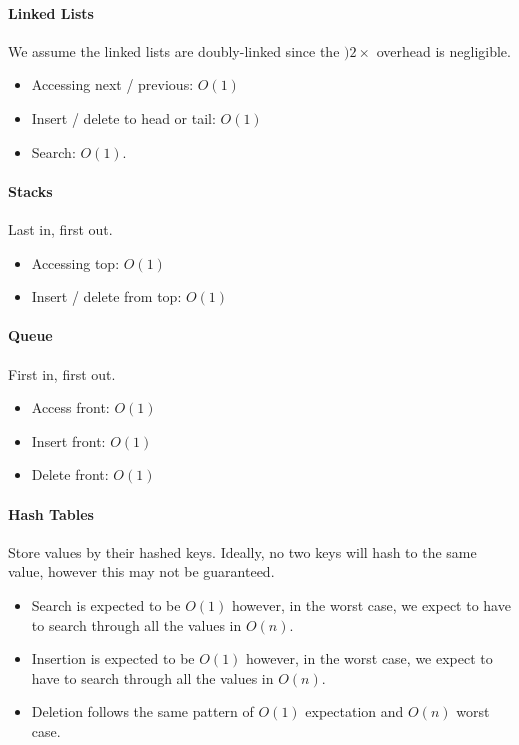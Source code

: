 \paragraph{Linked Lists}
We assume the linked lists are doubly-linked since the \()2\times \)  overhead is negligible.

\begin{itemize}
    \item Accessing next / previous: \(O(1)\)
    \item Insert / delete to head or tail: \(O(1)\)
    \item Search: \(O(1)\).
\end{itemize}

\paragraph{Stacks}
Last in, first out.
\begin{itemize}
    \item Accessing top: \(O(1)\)
    \item Insert / delete from top: \(O(1)\)
\end{itemize}

\paragraph{Queue}
First in, first out.
\begin{itemize}
    \item Access front: \(O(1)\)
    \item Insert front: \(O(1)\)
    \item Delete front: \(O(1)\)
\end{itemize}

\paragraph{Hash Tables}
Store values by their hashed keys.
Ideally, no two keys will hash to the same value, however this may not be guaranteed.

\begin{itemize}
    \item Search is expected to be \(O(1)\) however, in the worst case, we expect to have to search through all the values in \(O(n)\).
    \item Insertion is expected to be \(O(1)\) however, in the worst case, we expect to have to search through all the values in \(O(n)\).
    \item Deletion follows the same pattern of \(O(1)\) expectation and \(O(n)\) worst case.
\end{itemize}

